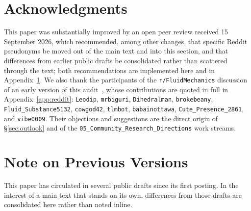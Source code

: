 \documentclass[11pt,a4paper]{article}
\begin{document}
\section*{Acknowledgments}

This paper was substantially improved by an open peer review received 15 September 2026, which
recommended, among other changes, that specific Reddit pseudonyms be moved out of the main text and
into this section, and that differences from earlier public drafts be consolidated rather than
scattered through the text; both recommendations are implemented here and in
Appendix~\ref{app:versions}. We also thank the participants of the \texttt{r/FluidMechanics}
discussion of an early version of this audit~\cite{RedditFluidMech2026}, whose contributions are
quoted in full in Appendix~\ref{app:reddit}: \texttt{Leodip}, \texttt{mrbiguri},
\texttt{Dihedralman}, \texttt{brokebeany}, \texttt{Fluid\_Substance5132}, \texttt{cowgod42},
\texttt{tlmbot}, \texttt{babainottawa}, \texttt{Cute\_Presence\_2861}, and \texttt{vibe0009}. Their
objections and suggestions are the direct origin of \S\ref{sec:outlook} and of the
\texttt{05\_Community\_Research\_Directions} work streams.

\appendix

\section{Note on Previous Versions}
\label{app:versions}

This paper has circulated in several public drafts since its first posting. In the interest of a
main text that stands on its own, differences from those drafts are consolidated here rather than
noted inline.
\end{document}
